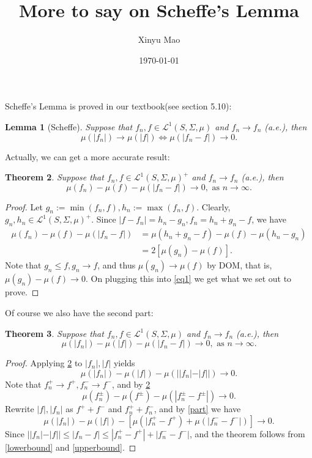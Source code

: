 \documentclass[12pt]{article}
\title{More to say on Scheffe's Lemma}
\author{Xinyu Mao}
\date{\today}
\theoremstyle{plain}
\newtheorem{theorem}{Theorem}
\newtheorem{lemma}[theorem]{Lemma}
\theoremstyle{definition}
\newcommand\LL{\mathcal{L}^1(S,\Sigma,\mu)}
\begin{document}
\maketitle
Scheffe's Lemma is proved in our textbook(see section 5.10):
\begin{lemma}[Scheffe] \label{scheffe}
    Suppose that $f_n, f \in \LL$ and $f_n \to f_n$ (a.e.), then
    $$
        \mu(|f_n|) \to \mu(|f|) \iff \mu(|f_n - f|) \to 0.
    $$
\end{lemma}

Actually, we can get a more accurate result:
\begin{theorem} \label{main}
    Suppose that $f_n, f \in \LL^+$ and $f_n \to f_n$ (a.e.), then
    $$
        \mu(f_n) - \mu(f) - \mu(|f_n - f|) \to 0, \text{ as $n \to \infty $}.
    $$
\end{theorem}
\begin{proof}
    Let $g_n := \min(f_n,f), h_n := \max(f_n,f)$. 
    Clearly, $g_n,h_n \in \LL^+$.
    Since $|f - f_n| = h_n - g_n, f_n = h_n + g_n - f$, we have
    \begin{equation} \label{eq1}
        \begin{aligned}
            \mu(f_n) - \mu(f) - \mu(|f_n - f|) 
            &=\mu(h_n + g_n - f) - \mu(f)  - \mu(h_n - g_n) \\
            &= 2[\mu(g_n) - \mu(f)].
        \end{aligned}
    \end{equation}
    Note that $g_n \leq f, g_n \to f$,  
    and thus $\mu(g_n) \to \mu(f)$ by DOM, that is, $\mu(g_n) - \mu(f) \to 0$.
    On plugging this into \cref{eq1} we get what we set out to prove.
\end{proof}

Of course we also have the second part:
\begin{theorem}
    Suppose that $f_n, f \in \LL$ and $f_n \to f_n$ (a.e.), then
    $$
        \mu(|f_n|) - \mu(|f|) - \mu(|f_n - f|) \to 0, \text{ as $n \to \infty $}.
    $$
\end{theorem}
\begin{proof}
    Applying \cref{main} to $|f_n|,|f|$ yields
    \begin{equation}\label{lowerbound}
        \mu(|f_n|) - \mu(|f|) - \mu(||f_n| - |f||) \to 0.
    \end{equation}
    Note that $f_n^+ \to f^+, f_n^- \to f^-$, and by \cref{main}
    \begin{equation} \label{part}
        \mu(f_n^\pm) - \mu(f^\pm) - \mu(|f_n^\pm - f^\pm|) \to 0.
    \end{equation}
    Rewrite $|f|, |f_n|$ as $f^+ + f^-$ and $f_n^+ + f_n^-$, and by \cref{part} we have 
    \begin{equation} \label{upperbound}
        \mu(|f_n|) - \mu(|f|) - [\mu(|f_n^+ - f^+) + \mu(|f_n^- - f^-|)] \to 0.
    \end{equation}
    Since $||f_n| - |f|| \leq |f_n - f| \leq |f_n^+ - f^+| + |f_n^- - f^-|$, 
    and the theorem follows from \cref{lowerbound} and \cref{upperbound}.
\end{proof}
\end{document}
